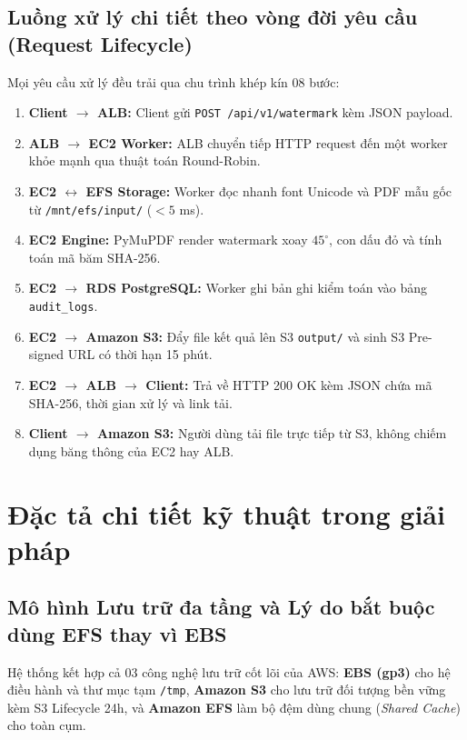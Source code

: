 \documentclass[12pt,a4paper]{report}
\begin{document}
\subsection{Luồng xử lý chi tiết theo vòng đời yêu cầu (Request Lifecycle)}
Mọi yêu cầu xử lý đều trải qua chu trình khép kín 08 bước:
\begin{enumerate}
    \item \textbf{Client $\to$ ALB:} Client gửi \texttt{POST /api/v1/watermark} kèm JSON payload.
    \item \textbf{ALB $\to$ EC2 Worker:} ALB chuyển tiếp HTTP request đến một worker khỏe mạnh qua thuật toán Round-Robin.
    \item \textbf{EC2 $\leftrightarrow$ EFS Storage:} Worker đọc nhanh font Unicode và PDF mẫu gốc từ \texttt{/mnt/efs/input/} ($< 5$ ms).
    \item \textbf{EC2 Engine:} PyMuPDF render watermark xoay $45^\circ$, con dấu đỏ và tính toán mã băm SHA-256.
    \item \textbf{EC2 $\to$ RDS PostgreSQL:} Worker ghi bản ghi kiểm toán vào bảng \texttt{audit\_logs}.
    \item \textbf{EC2 $\to$ Amazon S3:} Đẩy file kết quả lên S3 \texttt{output/} và sinh S3 Pre-signed URL có thời hạn 15 phút.
    \item \textbf{EC2 $\to$ ALB $\to$ Client:} Trả về HTTP 200 OK kèm JSON chứa mã SHA-256, thời gian xử lý và link tải.
    \item \textbf{Client $\to$ Amazon S3:} Người dùng tải file trực tiếp từ S3, không chiếm dụng băng thông của EC2 hay ALB.
\end{enumerate}

\section{Đặc tả chi tiết kỹ thuật trong giải pháp}

\subsection{Mô hình Lưu trữ đa tầng và Lý do bắt buộc dùng EFS thay vì EBS}
Hệ thống kết hợp cả 03 công nghệ lưu trữ cốt lõi của AWS: \textbf{EBS (gp3)} cho hệ điều hành và thư mục tạm \texttt{/tmp}, \textbf{Amazon S3} cho lưu trữ đối tượng bền vững kèm S3 Lifecycle 24h, và \textbf{Amazon EFS} làm bộ đệm dùng chung (\textit{Shared Cache}) cho toàn cụm.
\end{document}
